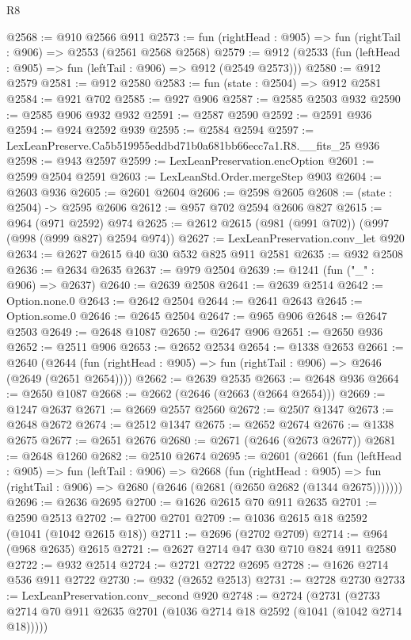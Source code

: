 \begin{lexlean}{R8}
\begin{coremodule}
@2568 := @910 @2566 @911
@2573 := fun (rightHead : @905) => fun (rightTail : @906) => @2553 (@2561 @2568 @2568)
@2579 := @912 (@2533 (fun (leftHead : @905) => fun (leftTail : @906) => @912 (@2549 @2573)))
@2580 := @912 @2579
@2581 := @912 @2580
@2583 := fun (state : @2504) => @912 @2581
@2584 := @921 @702
@2585 := @927 @906
@2587 := @2585 @2503 @932
@2590 := @2585 @906 @932 @932
@2591 := @2587 @2590
@2592 := @2591 @936
@2594 := @924 @2592 @939
@2595 := @2584 @2594
@2597 := LexLeanPreserve.Ca5b519955eddbd71b0a681bb66ecc7a1.R8.__fits_25 @936
@2598 := @943 @2597
@2599 := LexLeanPreservation.encOption
@2601 := @2599 @2504 @2591
@2603 := LexLeanStd.Order.mergeStep @903
@2604 := @2603 @936
@2605 := @2601 @2604
@2606 := @2598 @2605
@2608 := (state : @2504) -> @2595 @2606
@2612 := @957 @702 @2594 @2606 @827
@2615 := @964 (@971 @2592) @974
@2625 := @2612 @2615 (@981 (@991 @702)) (@997 (@998 (@999 @827) @2594 @974))
@2627 := LexLeanPreservation.conv_let @920
@2634 := @2627 @2615 @40 @30 @532 @825 @911 @2581
@2635 := @932 @2508
@2636 := @2634 @2635
@2637 := @979 @2504
@2639 := @1241 (fun ("_" : @906) => @2637)
@2640 := @2639 @2508
@2641 := @2639 @2514
@2642 := Option.none.{0}
@2643 := @2642 @2504
@2644 := @2641 @2643
@2645 := Option.some.{0}
@2646 := @2645 @2504
@2647 := @965 @906
@2648 := @2647 @2503
@2649 := @2648 @1087
@2650 := @2647 @906
@2651 := @2650 @936
@2652 := @2511 @906
@2653 := @2652 @2534
@2654 := @1338 @2653
@2661 := @2640
    (@2644 (fun (rightHead : @905) => fun (rightTail : @906) => @2646 (@2649 (@2651 @2654))))
@2662 := @2639 @2535
@2663 := @2648 @936
@2664 := @2650 @1087
@2668 := @2662 (@2646 (@2663 (@2664 @2654)))
@2669 := @1247 @2637
@2671 := @2669 @2557 @2560
@2672 := @2507 @1347
@2673 := @2648 @2672
@2674 := @2512 @1347
@2675 := @2652 @2674
@2676 := @1338 @2675
@2677 := @2651 @2676
@2680 := @2671 (@2646 (@2673 @2677))
@2681 := @2648 @1260
@2682 := @2510 @2674
@2695 := @2601
    (@2661
      (fun (leftHead : @905) =>
      fun (leftTail : @906) =>
      @2668
        (fun (rightHead : @905) =>
        fun (rightTail : @906) => @2680 (@2646 (@2681 (@2650 @2682 (@1344 @2675)))))))
@2696 := @2636 @2695
@2700 := @1626 @2615 @70 @911 @2635
@2701 := @2590 @2513
@2702 := @2700 @2701
@2709 := @1036 @2615 @18 @2592 (@1041 (@1042 @2615 @18))
@2711 := @2696 (@2702 @2709)
@2714 := @964 (@968 @2635) @2615
@2721 := @2627 @2714 @47 @30 @710 @824 @911 @2580
@2722 := @932 @2514
@2724 := @2721 @2722 @2695
@2728 := @1626 @2714 @536 @911 @2722
@2730 := @932 (@2652 @2513)
@2731 := @2728 @2730
@2733 := LexLeanPreservation.conv_second @920
@2748 := @2724
    (@2731 (@2733 @2714 @70 @911 @2635 @2701 (@1036 @2714 @18 @2592 (@1041 (@1042 @2714 @18)))))

\end{coremodule}
\end{lexlean}
